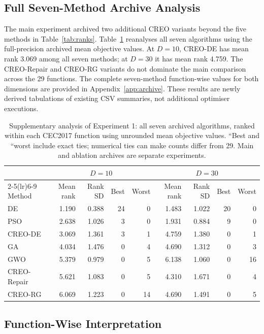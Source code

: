 \documentclass[journal]{IEEEtran}
\begin{document}
\subsection{Full Seven-Method Archive Analysis}

The main experiment archived two additional CREO variants beyond the five methods in Table~\ref{tab:ranks}. Table~\ref{tab:all7} reanalyses all seven algorithms using the full-precision archived mean objective values. At $D=10$, CREO-DE has mean rank 3.069 among all seven methods; at $D=30$ it has mean rank 4.759. The CREO-Repair and CREO-RG variants do not dominate the main comparison across the 29 functions. The complete seven-method function-wise values for both dimensions are provided in Appendix~\ref{app:archive}. These results are newly derived tabulations of existing CSV summaries, not additional optimiser executions.

\begin{table}[t]
\centering
\caption{Supplementary analysis of Experiment 1: all seven archived algorithms, ranked within each CEC2017 function using unrounded mean objective values. ``Best and ``worst include exact ties; numerical ties can make counts differ from 29. Main and ablation archives are separate experiments.}
\label{tab:all7}
\small
\begin{tabular}{lrrrr|rrrr}
\toprule
& \multicolumn{4}{c}{$D=10$} & \multicolumn{4}{c}{$D=30$}\\
\cmidrule(lr){2-5}\cmidrule(lr){6-9}
Method & Mean rank & Rank SD & Best & Worst & Mean rank & Rank SD & Best & Worst\\
\midrule
DE & 1.190 & 0.388 & 24 & 0 & 1.483 & 1.022 & 20 & 0\\
PSO & 2.638 & 1.026 & 3 & 0 & 1.931 & 0.884 & 9 & 0\\
CREO-DE & 3.069 & 1.361 & 3 & 1 & 4.759 & 1.380 & 0 & 1\\
GA & 4.034 & 1.476 & 0 & 4 & 4.690 & 1.312 & 0 & 3\\
GWO & 5.379 & 0.979 & 0 & 5 & 6.138 & 1.060 & 0 & 16\\
CREO-Repair & 5.621 & 1.083 & 0 & 5 & 4.310 & 1.671 & 0 & 4\\
CREO-RG & 6.069 & 1.223 & 0 & 14 & 4.690 & 1.491 & 0 & 5\\
\bottomrule
\end{tabular}
\end{table}

\subsection{Function-Wise Interpretation}
\end{document}
